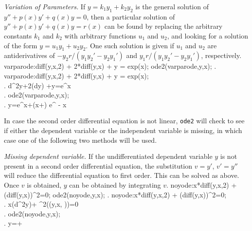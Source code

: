\documentclass{article}
\begin{document}
\medskip

\noindent
\textit{Variation of Parameters.}\quad
If $y=k_1y_1 + k_2y_2$ is the general solution of
$y'' + p(x)y' + q(x)y = 0$,  then a particular solution 
of $y'' + p(x)y' + q(x)y = r(x)$ can
be found by replacing the arbitrary constants $k_1$ and $k_2$ with
arbitrary functions $u_1$ and $u_2$, and looking for a solution of the
form $y=u_1y_1 + u_2y_2$.  One such solution is given if $u_1$ and
$u_2$ are antiderivatives of $-y_2r/(y_1y_2' - y_2y_1')$ and
$y_1r/(y_1y_2' - y_2y_1')$, respectively.
\beginmaximasession
varparode:diff(y,x,2) + 2*diff(y,x) + y = exp(x);
ode2(varparode,y,x);
\maximatexsession
{}.  varparode:diff(y,x,2) + 2*diff(y,x) + y = exp(x); \\
.   {{d^{2}}}\*y+2\*\left({{d}}\*y\right)
 +y=e^{x} \\
.  ode2(varparode,y,x); \\
.   y={{e^{x}}}+\left(\*x+\right)
 \*e^ {- x } \\
\endmaximasession

\medskip

In case the second order differential equation is not linear,
\texttt{ode2} will check to see if either the dependent variable or
the independent variable is missing, in which case one of the following two
methods will be used.

\smallskip

\noindent
\textit{Missing dependent variable.}\quad
If the undifferentiated dependent variable $y$ is not present in a
second order differential equation, the substitution $v=y'$, $v'=y''$
will reduce the differential equation to first order.  This can be
solved as above. Once $v$ is obtained, $y$ can be obtained by
integrating $v$. 
\beginmaximasession
noyode:x*diff(y,x,2) + (diff(y,x))^2=0;
ode2(noyode,y,x);
\maximatexsession
{}.  noyode:x*diff(y,x,2) + (diff(y,x))^2=0; \\
.   x\*\left({{d^{2}}}\*y\right)+
 ^{2}\left(\left(y,\linebreak[0]x,
 \right)\right)=0 \\
.  ode2(noyode,y,x); \\
.   y=+ \\
\endmaximasession

\smallskip
\end{document}
